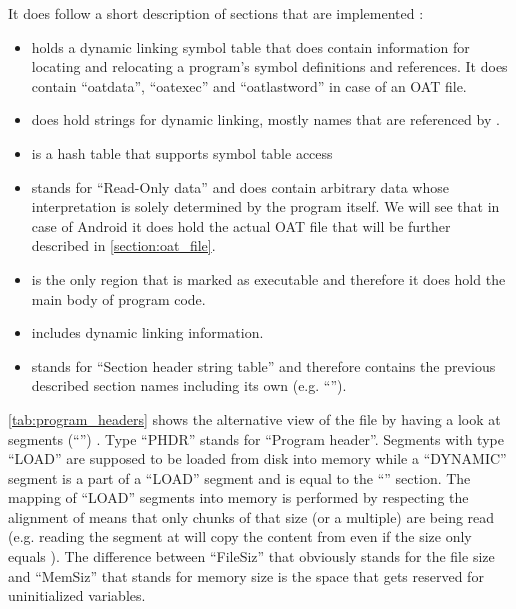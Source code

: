 It does follow a short description of sections that are implemented
\parencite{life_of_binaries}:
\begin{itemize}
    \item {} holds a dynamic linking symbol table that
    does contain information for locating and relocating a program's
    symbol definitions and references. It does contain ``oatdata'',
    ``oatexec'' and ``oatlastword'' in case of an OAT file.
    \item {} does hold strings for dynamic linking,
    mostly names that are referenced by .
    \item {} is a hash table that supports symbol table access
    \item {} stands for ``Read-Only data'' and does
    contain arbitrary data whose interpretation is solely
    determined by the program itself. We will
    see that in case of Android it does hold the actual OAT file
    that will be further described in \autoref{section:oat_file}.
    \item {} is the only region that is marked as
    executable and therefore it does hold the main body of
    program code.
    \item {} includes dynamic linking information.
    \item {} stands for ``Section header string
    table'' and therefore contains the previous described
    section names including its own (e.g. ``'').
\end{itemize}

\autoref{tab:program_headers} shows the alternative view of the
file by having a look at segments (``'')
. Type ``PHDR'' stands for ``Program header''. Segments with type
``LOAD'' are supposed to be loaded from disk into memory while
a ``DYNAMIC'' segment is a part of a ``LOAD'' segment and is equal
to the ``'' section. The mapping of ``LOAD'' segments
into memory is performed by respecting the alignment of 
means that only chunks of that size (or a multiple) are being read
(e.g. reading the segment at  will copy the content
from  even if the size only equals ).
The difference between ``FileSiz'' that obviously stands for the file
size and ``MemSiz'' that stands for memory size is the space that
gets reserved for uninitialized variables.

